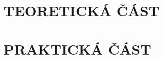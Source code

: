 \documentclass{template-definitions/thesistbuinzlin}
\begin{document}
\part{TEORETICKÁ ČÁST}



\part{PRAKTICKÁ ČÁST}









\paragraphindentationstop


\insertlistofreferences


\end{document}
